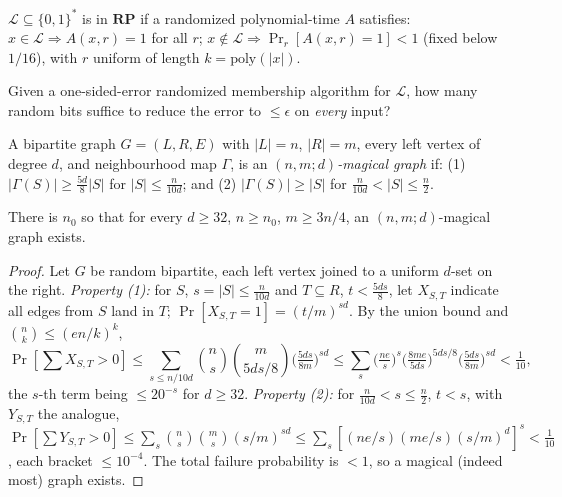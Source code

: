 \begin{definition}
  \label{def:rp-class}
  $\mathcal L\subseteq\{0,1\}^*$ is in $\mathbf{RP}$ if a randomized
  polynomial-time $A$ satisfies: $x\in\mathcal L\Rightarrow A(x,r)=1$ for all
  $r$; $x\notin\mathcal L\Rightarrow\Pr_r[A(x,r)=1]<1$ (fixed below $1/16$),
  with $r$ uniform of length $k=\mathrm{poly}(|x|)$.
\end{definition}

\begin{problem}
  \label{prob:saving-random-bits}
  Given a one-sided-error randomized membership algorithm for $\mathcal L$, how
  many random bits suffice to reduce the error to $\le\epsilon$ on \emph{every}
  input?
\end{problem}


\begin{definition}
  \label{def:magical-graph}
  A bipartite graph $G=(L,R,E)$ with $|L|=n$, $|R|=m$, every left vertex of
  degree $d$, and neighbourhood map $\Gamma$, is an \emph{$(n,m;d)$-magical
  graph} if: (1) $|\Gamma(S)|\ge\tfrac{5d}8|S|$ for $|S|\le\tfrac n{10d}$; and
  (2) $|\Gamma(S)|\ge|S|$ for $\tfrac n{10d}<|S|\le\tfrac n2$.
\end{definition}

\begin{lemma}
  \label{lem:magical-exists}
  There is $n_0$ so that for every $d\ge32$, $n\ge n_0$, $m\ge3n/4$, an
  $(n,m;d)$-magical graph exists.
\end{lemma}
\begin{proof}
  Let $G$ be random bipartite, each left vertex joined to a uniform $d$-set on
  the right. \emph{Property (1):} for $S$, $s=|S|\le\tfrac n{10d}$ and
  $T\subseteq R$, $t<\tfrac{5ds}8$, let $X_{S,T}$ indicate all edges from $S$
  land in $T$; $\Pr[X_{S,T}=1]=(t/m)^{sd}$. By the union bound and
  $\binom nk\le(en/k)^k$,
  \[\Pr[\textstyle\sum X_{S,T}>0]\le\sum_{s\le n/10d}\binom ns\binom m{5ds/8}
    \bigl(\tfrac{5ds}{8m}\bigr)^{sd}\le\sum_s\bigl(\tfrac{ne}s\bigr)^s
    \bigl(\tfrac{8me}{5ds}\bigr)^{5ds/8}\bigl(\tfrac{5ds}{8m}\bigr)^{sd}<\tfrac1{10},\]
  the $s$-th term being $\le20^{-s}$ for $d\ge32$. \emph{Property (2):} for
  $\tfrac n{10d}<s\le\tfrac n2$, $t<s$, with $Y_{S,T}$ the analogue,
  $\Pr[\sum Y_{S,T}>0]\le\sum_s\binom ns\binom ms(s/m)^{sd}
  \le\sum_s[(ne/s)(me/s)(s/m)^d]^s<\tfrac1{10}$, each bracket $\le10^{-4}$. The
  total failure probability is $<1$, so a magical (indeed most) graph exists.
\end{proof}

